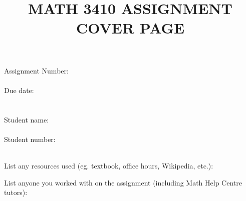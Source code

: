 \documentclass[12pt,letterpaper]{article}
\title{MATH 3410 ASSIGNMENT COVER PAGE}
\date{}
\begin{document}
\maketitle
\large
\begin{tabbing}
Assignment Number: \= \underline{\hspace{1in}}\\
\\
Due date: \> \underline{\hspace{4in}}\\
\\
\\
Student name: \> \underline{\hspace{4in}}\\
\\
Student number: \> \underline{\hspace{4in}}\\
\\
\end{tabbing}

\vspace{0.5in}

List any resources used (eg. textbook, office hours, Wikipedia, etc.):

\vspace{1.5in}

List anyone you worked with on the assignment (including Math Help Centre tutors):
\end{document}

